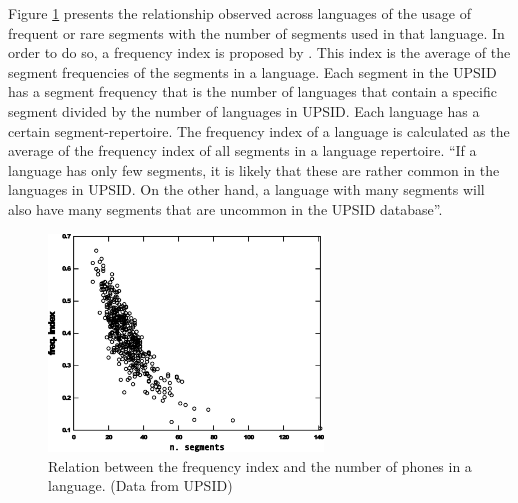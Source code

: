 




Figure \ref{fig:freqidx_nsegs_upsid} presents the relationship observed across languages of the 
usage of frequent or rare segments with the number of segments used in that language. 
In order to do so, a frequency index is proposed by \cite{reetz2010}. 
This index is the average of the segment frequencies of the segments in a language. 
Each segment in the UPSID has a segment frequency that is the number of languages that contain 
a specific segment divided by the number of languages in UPSID. 
Each language has a certain segment-repertoire. The frequency index of a language is calculated 
as the average of the frequency index of all segments in a language repertoire. 
``If a language has only few segments, it is likely that these are rather common in the languages 
in UPSID. On the other hand, a language with many segments will also have many segments that are 
uncommon in the UPSID database''\citep{reetz2010}.

\begin{figure}[h!]
\centering
\includegraphics[width=0.65\textwidth]{images/freqidx_nsegs_upsid.pdf}
\caption{Relation between the frequency index and the number of phones in a language. (Data from UPSID)}
\label{fig:freqidx_nsegs_upsid}
\end{figure} 

